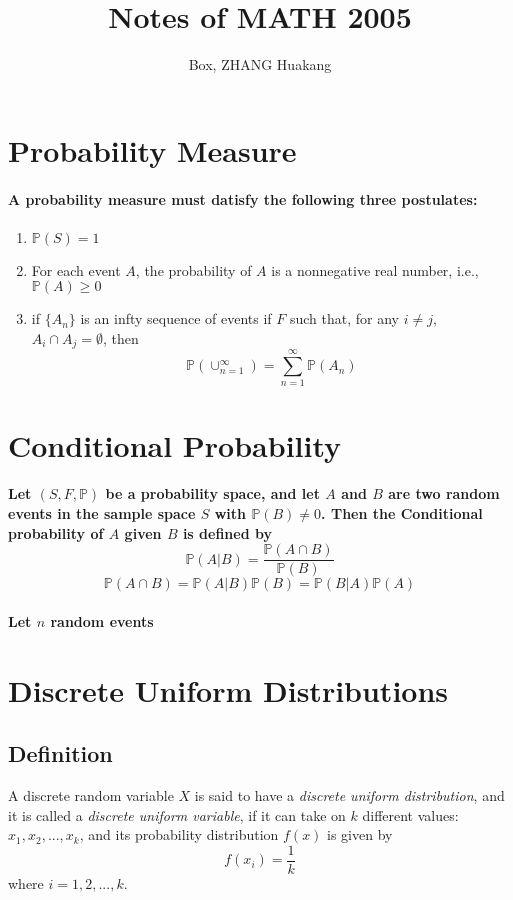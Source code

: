 \documentclass[titlepage]{article}
\title{Notes of MATH 2005}
\author{Box, ZHANG Huakang}
\begin{document}
    \maketitle
    \tableofcontents
    \section{Probability Measure}
        \paragraph{
            A probability measure must datisfy the following three postulates:
        }
        \begin{enumerate}
            \item $\mathbb{P}(S)=1$
            \item For each event $A$, the probability of $A$ is a nonnegative real number, i.e., $\mathbb{P}(A)\geq 0$
            \item if $\{A_n\}$ is an infty sequence of events if $F$ such that, for any $i\neq j$, $A_i\cap A_j=\emptyset$, then $$\mathbb{P}(\cup_{n=1}^\infty)=\sum_{n=1}^\infty\mathbb{P}(A_n)$$
        \end{enumerate}
    \section{Conditional Probability}
        \paragraph{
            Let $(S,F,\mathbb{P})$ be a probability space, and let $A$ and $B$ are two random events in the sample space $S$ with $\mathbb{P}(B)\neq 0$. Then the Conditional probability of $A$ given $B$ is defined by 
            $$\mathbb{P}(A|B)=\frac{\mathbb{P}(A\cap B)}{\mathbb{P}(B)}$$
            $$\mathbb{P}(A\cap B)=\mathbb{P}(A|B)\mathbb{P}(B)=\mathbb{P}(B|A)\mathbb{P}(A)$$
        }
        \paragraph{
            Let $n$ random events
        }
    \section{Discrete Uniform Distributions}
        \subsection*{Definition}
            A discrete random variable $X$ is said to have a \textit{discrete uniform distribution}, and it is called a \textit{discrete uniform variable}, if it can take on $k$ different values: $x_1,x_2,...,x_k$, and its probability distribution $f(x)$ is given by
            $$f(x_i)=\frac{1}{k}$$
            where $i=1,2,...,k$.
\end{document}
